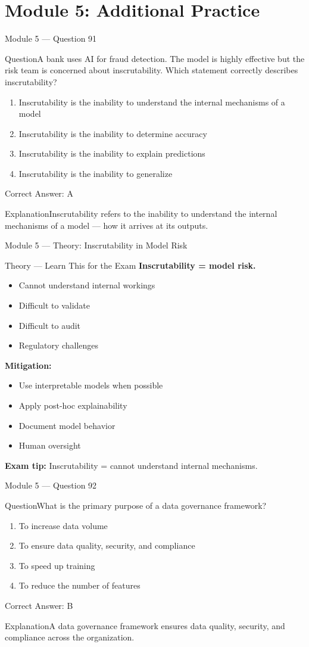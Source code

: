 \documentclass[aspectratio=169,10pt]{beamer}
\newcommand{\question}[1]{\begin{block}{Question}#1\end{block}}
\newcommand{\options}[4]{%
	\begin{enumerate}[label=\Alph*.,leftmargin=*]
		\item #1
		\item #2
		\item #3
		\item #4
	\end{enumerate}
}
\newcommand{\answerbox}[1]{\begin{exampleblock}{Correct Answer: #1}\end{exampleblock}}
\newcommand{\explain}[1]{\begin{block}{Explanation}#1\end{block}}
\newcommand{\theory}[1]{%
	\begin{block}{Theory --- Learn This for the Exam}
		\small #1
	\end{block}
}
\begin{document}
	\section{Module 5: Additional Practice}
	
	\begin{frame}{Module 5 --- Question 91}
		\question{A bank uses AI for fraud detection. The model is highly effective but the risk team is concerned about inscrutability. Which statement correctly describes inscrutability?}
		\options{Inscrutability is the inability to understand the internal mechanisms of a model}{Inscrutability is the inability to determine accuracy}{Inscrutability is the inability to explain predictions}{Inscrutability is the inability to generalize}
		\answerbox{A}
		\explain{Inscrutability refers to the inability to understand the internal mechanisms of a model --- how it arrives at its outputs.}
	\end{frame}
	
	\begin{frame}{Module 5 --- Theory: Inscrutability in Model Risk}
		\theory{
			\textbf{Inscrutability = model risk.}
			\begin{itemize}
				\item Cannot understand internal workings
				\item Difficult to validate
				\item Difficult to audit
				\item Regulatory challenges
			\end{itemize}
			\textbf{Mitigation:}
			\begin{itemize}
				\item Use interpretable models when possible
				\item Apply post-hoc explainability
				\item Document model behavior
				\item Human oversight
			\end{itemize}
			\textbf{Exam tip:} Inscrutability = cannot understand internal mechanisms.
		}
	\end{frame}
	
	\begin{frame}{Module 5 --- Question 92}
		\question{What is the primary purpose of a data governance framework?}
		\options{To increase data volume}{To ensure data quality, security, and compliance}{To speed up training}{To reduce the number of features}
		\answerbox{B}
		\explain{A data governance framework ensures data quality, security, and compliance across the organization.}
	\end{frame}
	
\end{document}
